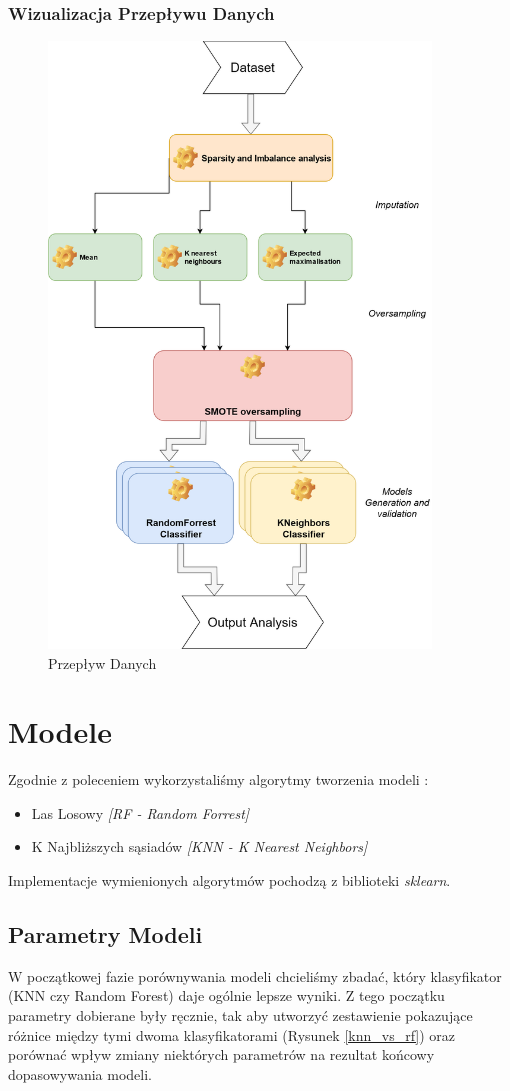 \documentclass[11pt]{article}
\begin{document}
\subsubsection{Wizualizacja Przepływu Danych}
\begin{figure}[h]
	\caption{Przepływ Danych}
	\begin{center}
		\includegraphics[width=4in]{Dataflow-no-MICE}
	\end{center}
\end{figure}
\section{Modele}
Zgodnie z poleceniem wykorzystaliśmy algorytmy tworzenia modeli : 
\begin{itemize}
	\item Las Losowy \textit{[RF - Random Forrest]}
	\item K Najbliższych sąsiadów \textit{[KNN - K Nearest Neighbors]}
\end{itemize}
Implementacje wymienionych algorytmów pochodzą z biblioteki \textit{sklearn}.
\subsection{Parametry Modeli}
W początkowej fazie porównywania modeli chcieliśmy zbadać, który klasyfikator (KNN czy Random Forest) daje ogólnie lepsze wyniki. Z tego początku parametry dobierane były ręcznie, tak aby utworzyć zestawienie pokazujące różnice między tymi dwoma klasyfikatorami (Rysunek \ref{knn_vs_rf}) oraz porównać wpływ zmiany niektórych parametrów na rezultat końcowy dopasowywania modeli.
\end{document}
